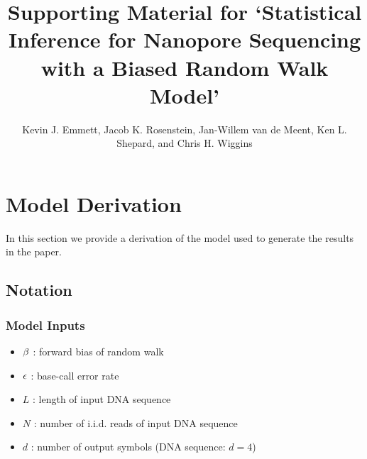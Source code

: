 \documentclass[10pt]{article}
\begin{document}
\title{Supporting Material for `Statistical Inference for Nanopore Sequencing with a Biased Random Walk Model'}

\author{Kevin J. Emmett,{\authdag *} Jacob K. Rosenstein,{\authpar} Jan-Willem van de Meent,{\authddag} Ken L. Shepard,{\addrS} and Chris H. Wiggins{\authddag}}

\date{}
\maketitle

\section{Model Derivation}

In this section we provide a derivation of the model used to generate the results in the paper.

\subsection{Notation}

\subsubsection{Model Inputs}
\begin{itemize}
\item $\beta$ : forward bias of random walk
\item $\epsilon$ : base-call error rate
\item $L$ : length of input DNA sequence
\item $N$ : number of i.i.d. reads of input DNA sequence
\item $d$ : number of output symbols (DNA sequence: $d=4$)
\end{itemize}
\end{document}
